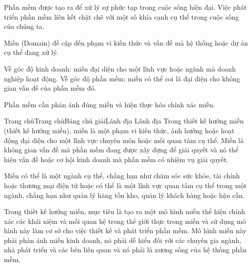 Phần mềm được tạo ra để xử lý sự phức tạp trong cuộc sống hiện đại. Việc phát triển phần mềm liên kết chặt chẽ với một số khía cạnh cụ thể trong cuộc sống của chúng ta.

Miền (Domain) đề cập đến phạm vi kiến thức và vấn đề mà hệ thống hoặc dự án cụ thể đang xử lý.

Về góc độ kinh doanh: miền đại diện cho một lĩnh vực hoặc ngành mà doanh nghiệp hoạt động.
Về góc độ phần mềm: miền có thể coi là đại diện cho không gian vấn đề của phần mềm đó.

Phần mềm cần phản ánh đúng miền và hiện thực hóa chính xác miền.




Trang chủTrang chủBảng chú giảiLãnh địa
Lãnh địa
Trong thiết kế hướng miền (thiết kế hướng miền), miền là một phạm vi kiến thức, ảnh hưởng hoặc hoạt động đại diện cho một lĩnh vực chuyên môn hoặc mối quan tâm cụ thể. Miền là không gian vấn đề mà phần mềm đang được xây dựng để giải quyết và nó thể hiện vấn đề hoặc cơ hội kinh doanh mà phần mềm có nhiệm vụ giải quyết.

Miền có thể là một ngành cụ thể, chẳng hạn như chăm sóc sức khỏe, tài chính hoặc thương mại điện tử hoặc có thể là một lĩnh vực quan tâm cụ thể trong một ngành, chẳng hạn như quản lý hàng tồn kho, quản lý khách hàng hoặc hậu cần.

Trong thiết kế hướng miền, mục tiêu là tạo ra một mô hình miền thể hiện chính xác các khái niệm và mối quan hệ trong thế giới thực trong miền và sử dụng mô hình này làm cơ sở cho việc thiết kế và phát triển phần mềm. Mô hình miền này phải phản ánh miền kinh doanh, nó phải dễ hiểu đối với các chuyên gia ngành, nhà phát triển và các bên liên quan và nó phải là xương sống của hệ thống phần mềm.

